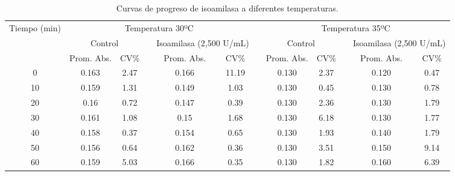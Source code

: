\documentclass{article}
\begin{document}
\begin{table}[H]
	\centering
	\caption{Curvas de progreso de isoamilasa a diferentes temperaturas.}
	\begin{adjustbox}{width=\textwidth}
	\begin{tabular}{cccccccccccc}
		\toprule
		\multicolumn{1}{c}{\multirow{3}[6]{*}{Tiempo (min)}} & \multicolumn{5}{c}{Temperatura 30ºC}  &       & \multicolumn{5}{c}{Temperatura 35ºC} \\
		\cmidrule{2-6}\cmidrule{8-12}          & \multicolumn{2}{c}{Control} &       & \multicolumn{2}{c}{Isoamilasa (2,500 U/mL)} &       & \multicolumn{2}{c}{Control} &       & \multicolumn{2}{c}{Isoamilasa (2,500 U/mL)} \\
		\cmidrule{2-3}\cmidrule{5-6}\cmidrule{8-9}\cmidrule{11-12}          & Prom. Abs. & CV\%  &       & Prom. Abs. & CV\%  &       & Prom. Abs. & CV\%  &       & Prom. Abs. & CV\% \\
		\midrule
		0     & 0.163 & 2.47  &       & 0.166 & 11.19 &       & 0.130 & 2.37  &       & 0.120 & 0.47 \\
		10    & 0.159 & 1.31  &       & 0.149 & 1.03  &       & 0.130 & 0.45  &       & 0.130 & 0.78 \\
		20    & 0.16  & 0.72  &       & 0.147 & 0.39  &       & 0.130 & 2.36  &       & 0.130 & 1.79 \\
		30    & 0.161 & 1.08  &       & 0.15  & 1.68  &       & 0.130 & 6.18  &       & 0.130 & 1.77 \\
		40    & 0.158 & 0.37  &       & 0.154 & 0.65  &       & 0.130 & 1.93  &       & 0.140 & 1.79 \\
		50    & 0.156 & 0.64  &       & 0.162 & 0.36  &       & 0.130 & 3.51  &       & 0.150 & 9.14 \\
		60    & 0.159 & 5.03  &       & 0.166 & 0.35  &       & 0.130 & 1.82  &       & 0.160 & 6.39 \\
		\bottomrule
	\end{tabular}%
	\end{adjustbox}
	\label{tab:c2}%
\end{table}%
\end{document}
